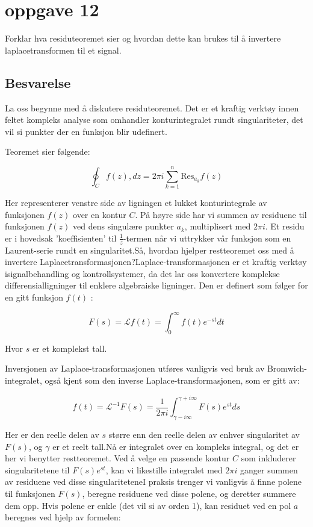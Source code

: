 \section{oppgave 12}

Forklar hva residuteoremet sier og hvordan dette kan brukes til å invertere laplacetransformen
til et signal.

\subsection*{Besvarelse}
La oss begynne med å diskutere residuteoremet. Det er et kraftig verktøy innen feltet kompleks analyse som omhandler konturintegralet rundt singulariteter, det vil si punkter der en funksjon blir udefinert.

Teoremet sier følgende:

\begin{equation*}
\oint_C f(z) , dz = 2\pi i \sum_{k=1}^{n} \text{Res}_{a_k} f(z)
\end{equation*}

Her representerer venstre side av ligningen et lukket konturintegrale av funksjonen $ f(z) $ over en kontur $ C $. På høyre side har vi summen av residuene til funksjonen $ f(z) $ ved dens singulære punkter $ a_{k} $, multiplisert med $ 2 \pi i $. Et residu er i hovedsak 'koeffisienten' til $ \frac{1}{z} $-termen når vi uttrykker vår funksjon som en Laurent-serie rundt en singularitet.Så, hvordan hjelper restteoremet oss med å invertere Laplacetransformasjonen?Laplace-transformasjonen er et kraftig verktøy isignalbehandling og kontrollsystemer, da det lar oss konvertere komplekse differensialligninger til enklere algebraiske ligninger. Den er definert som følger for en gitt funksjon $ f(t) $ :

\begin{equation*}
    F(s) = \mathcal{L}{f(t)} = \int_{0}^{\infty} f(t) e^{-st} dt
\end{equation*}
    
Hvor $s$ er et komplekst tall.

Inversjonen av Laplace-transformasjonen utføres vanligvis ved bruk av Bromwich-integralet, også kjent som den inverse Laplace-transformasjonen, som er gitt av:

\begin{equation*}
f(t) = \mathcal{L}^{-1}{F(s)} = \frac{1}{2\pi i} \int_{\gamma-i\infty}^{\gamma+i\infty} F(s) e^{st} ds
\end{equation*}

Her er den reelle delen av $ s $ større enn den reelle delen av enhver singularitet av $ F(s) $, og $ \gamma $ er et reelt tall.Nå er integralet over en kompleks integral, og det er her vi benytter restteoremet. Ved å velge en passende kontur $ C $ som inkluderer singularitetene til $ F(s) e^{s t} $, kan vi likestille integralet med $ 2 \pi i $ ganger summen av residuene ved disse singulariteteneI praksis trenger vi vanligvis å finne polene til funksjonen $ F(s) $, beregne residuene ved disse polene, og deretter summere dem opp. Hvis polene er enkle (det vil si av orden 1), kan residuet ved en pol $ a $ beregnes ved hjelp av formelen:

